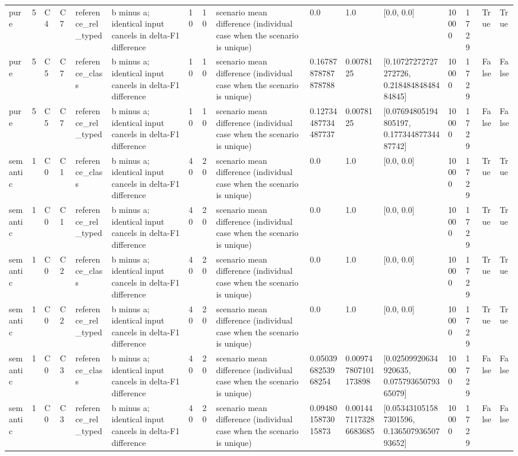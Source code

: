 \begin{tabular}{llllllllllllllll}
pure & 5 & C4 & C7 & reference\_rel\_typed & b minus a; identical input cancels in delta-F1 difference & 10 & 10 & scenario mean difference (individual case when the scenario is unique) & 0.0 & 1.0 & [0.0, 0.0] & 10000 & 1729 & True & True \\
pure & 5 & C5 & C7 & reference\_class & b minus a; identical input cancels in delta-F1 difference & 10 & 10 & scenario mean difference (individual case when the scenario is unique) & 0.16787878787878788 & 0.0078125 & [0.10727272727272726, 0.21848484848484845] & 10000 & 1729 & False & False \\
pure & 5 & C5 & C7 & reference\_rel\_typed & b minus a; identical input cancels in delta-F1 difference & 10 & 10 & scenario mean difference (individual case when the scenario is unique) & 0.12734487734487737 & 0.0078125 & [0.07694805194805197, 0.17734487734487742] & 10000 & 1729 & False & False \\
semantic & 1 & C0 & C1 & reference\_class & b minus a; identical input cancels in delta-F1 difference & 40 & 20 & scenario mean difference (individual case when the scenario is unique) & 0.0 & 1.0 & [0.0, 0.0] & 10000 & 1729 & True & True \\
semantic & 1 & C0 & C1 & reference\_rel\_typed & b minus a; identical input cancels in delta-F1 difference & 40 & 20 & scenario mean difference (individual case when the scenario is unique) & 0.0 & 1.0 & [0.0, 0.0] & 10000 & 1729 & True & True \\
semantic & 1 & C0 & C2 & reference\_class & b minus a; identical input cancels in delta-F1 difference & 40 & 20 & scenario mean difference (individual case when the scenario is unique) & 0.0 & 1.0 & [0.0, 0.0] & 10000 & 1729 & True & True \\
semantic & 1 & C0 & C2 & reference\_rel\_typed & b minus a; identical input cancels in delta-F1 difference & 40 & 20 & scenario mean difference (individual case when the scenario is unique) & 0.0 & 1.0 & [0.0, 0.0] & 10000 & 1729 & True & True \\
semantic & 1 & C0 & C3 & reference\_class & b minus a; identical input cancels in delta-F1 difference & 40 & 20 & scenario mean difference (individual case when the scenario is unique) & 0.0503968253968254 & 0.009747807101173898 & [0.02509920634920635, 0.07579365079365079] & 10000 & 1729 & False & False \\
semantic & 1 & C0 & C3 & reference\_rel\_typed & b minus a; identical input cancels in delta-F1 difference & 40 & 20 & scenario mean difference (individual case when the scenario is unique) & 0.0948015873015873 & 0.0014471173286683685 & [0.053431051587301596, 0.13650793650793652] & 10000 & 1729 & False & False \\

\end{tabular}
